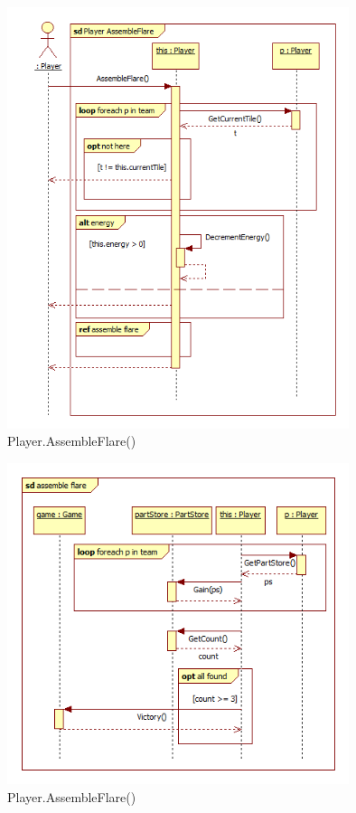 \begin{figure}[H]
	\begin{center}
		\includegraphics[width=10cm]{chapters/chapter03/seqdiag/Player_AssembleFlare.png}
		\caption{Player.AssembleFlare()}
		\label{fig:PlayerAssembleFlare}
	\end{center}
\end{figure}
\begin{figure}[H]
	\begin{center}
		\includegraphics[width=10cm]{chapters/chapter03/seqdiag/Player_assemble_flare.png}
		\caption{Player.AssembleFlare()}
		\label{fig:PlayerAssembleFlare2}
	\end{center}
\end{figure}
